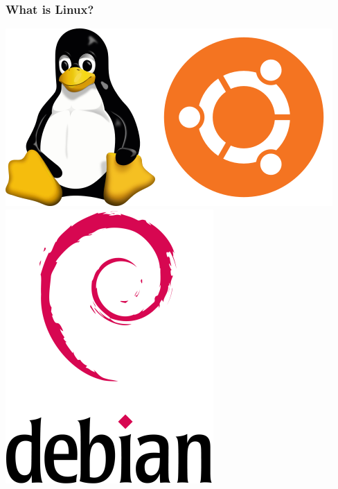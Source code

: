\documentclass[fleqn]{beamer} %
\newcommand{\sectiontitleI}{What is Linux?} %
\begin{document}
	\begin{frame} \small
		\frametitle{\sectiontitleI}
			
			\hspace*{1cm}\includegraphics[scale=.2]{Tux.png}\hspace{10mm}\includegraphics[scale=.2]{UbuntuCoF.png}\hspace{10mm}\includegraphics[scale=.15]{Debian_logo.png}


\end{frame}
\end{document}
